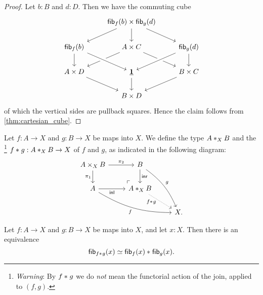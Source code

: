 \begin{proof}
Let $b:B$ and $d:D$. Then we have the commuting cube 
\begin{equation*}
\begin{tikzcd}
& \fib{f}{b}\times \fib{g}{d} \arrow[dl] \arrow[d] \arrow[dr] \\
\fib{f}{b} \arrow[d] & A\times C \arrow[dl] \arrow[dr] & \fib{g}{d} \arrow[dl,crossing over] \arrow[d] \\
A\times D \arrow[dr] & \unit \arrow[from=ul,crossing over] \arrow[d] & B\times C \arrow[dl] \\
& B\times D
\end{tikzcd}
\end{equation*}
of which the vertical sides are pullback squares. Hence the claim follows from \cref{thm:cartesian_cube}.
\end{proof}

\begin{defn}
Let $f:A\to X$ and $g:B\to X$ be maps into $X$. We define the type $\join[X]{A}{B}$ and the \footnote{\emph{Warning}: By $\join{f}{g}$ we do \emph{not} mean the functorial action of the
join, applied to $(f,g)$.} $\join{f}{g}:\join[X]{A}{B}\to X$ of
$f$ and $g$, as indicated in the following diagram:
\begin{equation*}
\begin{tikzcd}
A\times_X B \arrow[r,"\pi_2"] \arrow[d,swap,"\pi_1"] \arrow[dr, phantom, "{\ulcorner}", at end] & B \arrow[d,"\inr"] \arrow[ddr,bend left=15,"g"] \\
A \arrow[r,swap,"\inl"] \arrow[drr,bend right=15,swap,"f"] & \join[X]{A}{B} \arrow[dr,densely dotted,swap,near start,"\join{f}{g}" xshift=1ex] \\
& & X.
\end{tikzcd}
\end{equation*}
\end{defn}

\begin{thm}\label{defn:join-fiber}
Let $f:A\to X$ and $g:B\to X$ be maps into $X$, and let $x:X$. Then there is
an equivalence
\begin{equation*}
\eqv{\fib{\join{f}{g}}{x}}{\join{\fib{f}{x}}{\fib{g}{x}}}.
\end{equation*}
\end{thm}

